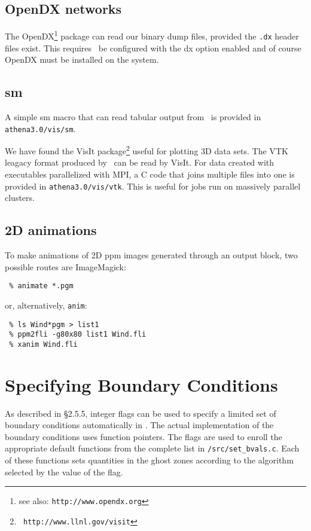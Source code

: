 \subsection{OpenDX networks}

The OpenDX\footnote{see also: {\tt http://www.opendx.org}} package can
read our binary dump files, provided the {\tt .dx} header files exist.
This requires \ath\ be configured with the dx option enabled and of
course OpenDX must be installed on the system.

\subsection{sm}

A simple sm macro that can read tabular output from \ath\ is provided
in {\tt athena3.0/vis/sm}.


We have found the VisIt package\footnote{{\tt
http://www.llnl.gov/visit}} useful for plotting 3D data sets.  The VTK leagacy
format produced by \ath\ can be read by VisIt.  For data created with
executables parallelized with MPI, a C code that joins multiple files into
one is provided in {\tt athena3.0/vis/vtk}.  This is useful for jobs run
on massively parallel clusters.

\subsection{2D animations}

To make animations of 2D ppm images generated through an output block,
two possible routes are ImageMagick:

\footnotesize
\begin{verbatim}
 % animate *.pgm
\end{verbatim}
\normalsize

or, alternatively, {\tt anim}:
\footnotesize
\begin{verbatim}
 % ls Wind*pgm > list1
 % ppm2fli -g80x80 list1 Wind.fli
 % xanim Wind.fli

\end{verbatim}
\normalsize

\section{Specifying Boundary Conditions}

As described in \S 2.5.5, integer flags can be used to specify a limited set
of boundary conditions automatically in \ath.  The actual implementation of
the boundary conditions uses function pointers.  The
flags are used to enroll the appropriate default 
functions from the complete list in {\tt /src/set\_bvals.c}.  Each of these
functions sets quantities in the ghost zones according to the 
algorithm selected by the value of the flag.

